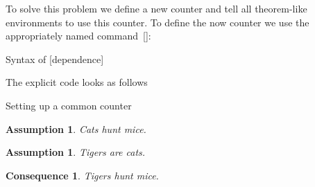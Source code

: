 To solve this problem we define a new counter  and tell all theorem-like environments to use this counter.
To define the now counter we use the appropriately named command~[\comname]:
\begin{showcode}{Syntax of }
[dependence]
\end{showcode}
The explicit code looks as follows
\begin{showlatex}{Setting up a common counter}

\newtheorem{assumption}[alltheorems]{Assumption}
\newtheorem{consequence}[alltheorems]{Consequence}

\begin{assumption}
  Cats hunt mice.
\end{assumption}

\begin{assumption}
  Tigers are cats.
\end{assumption}

\begin{consequence}
  Tigers hunt mice.
\end{consequence}
\end{showlatex}

